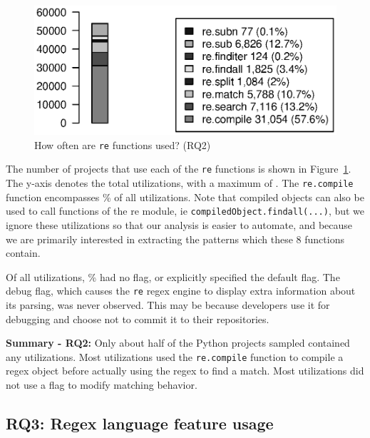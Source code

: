 \begin{figure}[tb]
\centering
\includegraphics[width=\columnwidth]{nontex/partFunctions.eps}
\vspace{-12pt}
\caption{How often are  {\tt re} functions used? (RQ2)}
\vspace{-6pt}
\label{fig:partFunctions}
\end{figure}



The number of projects that use each of the {\tt re} functions is shown in Figure~\ref{fig:partFunctions}.  The y-axis denotes the total utilizations, with a maximum of . The {\tt re.compile} function encompasses \% of all utilizations.
Note that compiled objects can also be used to call functions of the re module, ie {\tt compiledObject.findall(...)}, but we ignore these utilizations so that our analysis is easier to automate, and because we are primarily interested in extracting the patterns which these 8 functions contain.

Of all utilizations, \% had no flag, or explicitly specified the default flag.  The debug flag, which causes the {\tt re} regex engine to display extra information about its parsing, was never observed. This may be because developers use it for debugging and choose not to commit it to their repositories.

\vspace{6pt}
\textbf{Summary - RQ2:}
Only about half of the Python projects sampled contained any utilizations.  Most utilizations used the {\tt re.compile} function to compile a regex object before actually using the regex to find a match.  Most utilizations did not use a flag to modify matching behavior.

\subsection{RQ3: Regex language feature usage}
\label{results:rq3}


